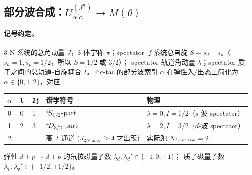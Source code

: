 \subsection{部分波合成：\texorpdfstring{$U_{\alpha' \alpha}^{(J^\pi)} \to M(\theta)$}{Uαα to M(θ)}}
\label{subsec:ch12-pw-summation}

\paragraph{记号约定。}
3-N 系统的总角动量 \(J\)，3 体宇称 \(\pi\)；spectator 子系统总自旋
\(S = s_d + s_p\)（\(s_d = 1, s_p = 1/2\)，所以 \(S = 1/2\) 或 \(3/2\)）；
spectator 轨道角动量 \(\lambda\)；spectator-质子之间的总轨道-自旋耦合
\(I\)。Tic-tac 的部分波索引 \(\alpha\) 在弹性入/出态上简化为
\(\alpha \in \{0, 1, 2\}\)，对应

\begin{center}
\begin{tabular}{cclll}
\toprule
\(\alpha\) & \texttt{l} & \texttt{2j} & 谱学符号 & 物理 \\
\midrule
0 & 0 & 1 & \({}^{4}\!S_{1/2}\)-part & \(\lambda = 0, I = 1/2\)（\(s\)-波 spectator） \\
1 & 2 & 3 & \({}^{4}\!D_{3/2}\)-part & \(\lambda = 2, I = 3/2\)（\(d\)-波 spectator） \\
2 & — & — & 高 \(\lambda\) 通道 (\(J_{2N\max} \geq 4\) 才出现) & 实际跑 \(N_{\rm deuteron} = 2\)\\
\bottomrule
\end{tabular}
\end{center}

弹性 \(d + p \to d + p\) 的氘核磁量子数 \(\lambda_d, \lambda_d' \in \{-1, 0, +1\}\)；
质子磁量子数 \(\lambda_p, \lambda_p' \in \{-1/2, +1/2\}\)。


